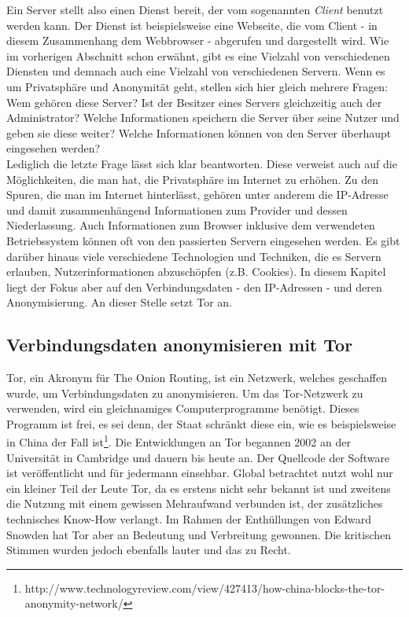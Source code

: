 Ein Server stellt also einen Dienst bereit, der vom sogenannten \textit{Client} benutzt werden kann.
Der Dienst ist beispielsweise eine Webseite, die vom Client - in diesem Zusammenhang dem Webbrowser - abgerufen und dargestellt wird.
Wie im vorherigen Abschnitt schon erwähnt, gibt es eine Vielzahl von verschiedenen Diensten und demnach auch eine Vielzahl von verschiedenen Servern.
Wenn es um Privatsphäre und Anonymität geht, stellen sich hier gleich mehrere Fragen:
Wem gehören diese Server?
Ist der Besitzer eines Servers gleichzeitig auch der Administrator?
Welche Informationen speichern die Server über seine Nutzer und geben sie diese weiter?
Welche Informationen können von den Server überhaupt eingesehen werden?
\\
Lediglich die letzte Frage lässt sich klar beantworten.
Diese verweist auch auf die Möglichkeiten, die man hat, die Privatsphäre im Internet zu erhöhen.
Zu den Spuren, die man im Internet hinterlässt, gehören unter anderem die IP-Adresse und damit zusammenhängend Informationen zum Provider und dessen Niederlassung.
Auch Informationen zum Browser inklusive dem verwendeten Betriebssystem können oft von den passierten Servern eingesehen werden.
Es gibt darüber hinaus viele verschiedene Technologien und Techniken, die es Servern erlauben, Nutzerinformationen abzuschöpfen (z.B. Cookies).
In diesem Kapitel liegt der Fokus aber auf den Verbindungsdaten - den IP-Adressen - und deren Anonymisierung.
An dieser Stelle setzt Tor an.

\subsection{Verbindungsdaten anonymisieren mit Tor}
Tor, ein Akronym für The Onion Routing, ist ein Netzwerk, welches geschaffen wurde, um Verbindungsdaten zu anonymisieren.
Um das Tor-Netzwerk zu verwenden, wird ein gleichnamiges Computerprogramme benötigt.
Dieses Programm ist frei, es sei denn, der Staat schränkt diese ein, wie es beispielsweise in China der Fall ist\footnote{http://www.technologyreview.com/view/427413/how-china-blocks-the-tor-anonymity-network/}.
Die Entwicklungen an Tor begannen 2002 an der Universität in Cambridge und dauern bis heute an. Der Quellcode der Software ist veröffentlicht und für jedermann einsehbar.
Global betrachtet nutzt wohl nur ein kleiner Teil der Leute Tor, da es erstens nicht sehr bekannt ist und zweitens die Nutzung mit einem gewissen Mehraufwand verbunden ist, der zusätzliches technisches Know-How verlangt. Im Rahmen der Enthüllungen von Edward Snowden hat Tor aber an Bedeutung und Verbreitung gewonnen. Die kritischen Stimmen wurden jedoch ebenfalls lauter und das zu Recht.

